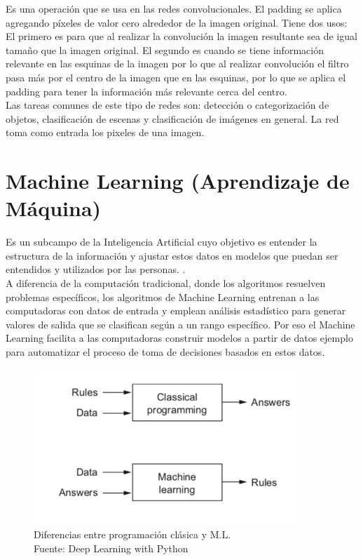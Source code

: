 Es una operación que se usa en las redes convolucionales. El padding se aplica agregando píxeles de valor cero alrededor de la imagen original.
Tiene dos usos:
El primero es para que al realizar la convolución la imagen resultante sea de igual tamaño que la imagen original.
El segundo es cuando se tiene información relevante en las esquinas de la imagen por lo que al realizar convolución el filtro pasa más por el centro de la imagen que en las esquinas, por lo que se aplica el padding para tener la información más relevante cerca del centro.\\

Las tareas comunes de este tipo de redes son: detección o categorización de objetos, clasificación de escenas y clasificación de imágenes en general. La red toma como entrada los pixeles de una imagen. 

\section{Machine Learning (Aprendizaje de Máquina)}
Es un subcampo de la Inteligencia Artificial cuyo objetivo es entender la estructura de la información y ajustar estos datos en modelos que puedan ser entendidos y utilizados por las personas. \cite{digitalocean:machinelearning}.\\

A diferencia de la computación tradicional, donde los algoritmos resuelven problemas específicos, los algoritmos de Machine Learning entrenan a las computadoras con datos de entrada y emplean análisis estadístico para generar valores de salida que se clasifican según a un rango específico. Por eso el Machine Learning facilita a las computadoras construir modelos a partir de datos ejemplo para automatizar el proceso de toma de decisiones basados en estos datos.\\

\begin{figure}[H]
    \begin{center}
        \includegraphics[width=10cm]{img/capitulo_2/machinelearning.png}
    \end{center}
    \caption{Diferencias entre programación clásica y M.L.\\Fuente: Deep Learning with Python}
    \label{fig:classical_ml}
\end{figure}

